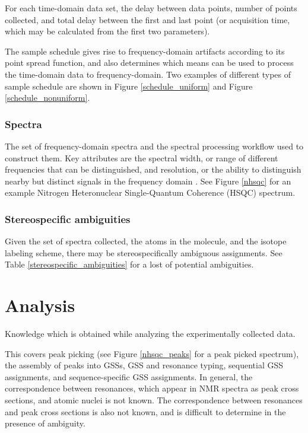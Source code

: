 For each time-domain data set, the delay between data points, number of 
points collected, and total delay between the first and last point (or 
acquisition time, which may be calculated from the first two parameters).

The sample schedule gives rise to frequency-domain artifacts according to 
its point spread function, and also determines which means can be used to
process the time-domain data to frequency-domain.  Two examples of different
types of sample schedule are shown in Figure \ref{schedule_uniform} and
Figure \ref{schedule_nonuniform}.

\subsubsection{Spectra}
The set of frequency-domain spectra and the spectral processing workflow
used to construct them.  Key attributes are the spectral width, or range of
different frequencies that can be distinguished, and resolution, or the
ability to distinguish nearby but distinct signals in the frequency domain
\cite{ernst2004}.  See Figure \ref{nhsqc} for an example Nitrogen 
Heteronuclear Single-Quantum Coherence (HSQC) spectrum.

\subsubsection{Stereospecific ambiguities}
Given the set of spectra collected, the atoms in the molecule, and the isotope
labeling scheme, there may be stereospecifically ambiguous assignments.  See
Table \ref{stereospecific_ambiguities} for a lost of potential ambiguities.



\section{Analysis}
Knowledge which is obtained while analyzing the experimentally collected data.

This covers peak picking (see Figure \ref{nhsqc_peaks} for a peak picked spectrum), 
the assembly of peaks into GSSs, GSS and resonance typing, sequential
GSS assignments, and sequence-specific GSS assignments.
In general, the correspondence between resonances, which appear in NMR spectra 
as peak cross sections, and atomic nuclei is not known.  The correspondence 
between resonances and peak cross sections is also not known, and is difficult 
to determine in the presence of ambiguity.

